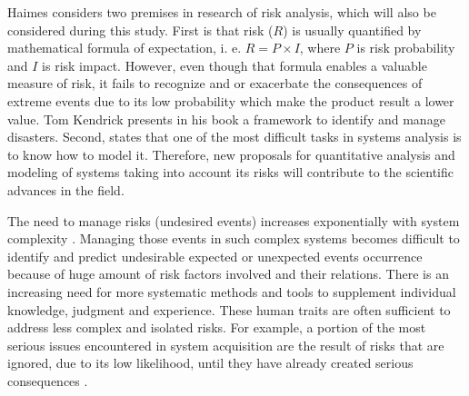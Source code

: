 Haimes \cite{Haimes2009} considers two premises in research of risk analysis, which will also be considered during this study. First is that risk ($R$) is usually quantified by mathematical formula of expectation, i. e. $R = P \times I$, where $P$ is risk probability and $I$ is risk impact. However, even though that formula enables a valuable measure of risk, it fails to recognize and or exacerbate the consequences of extreme events due to its low probability which make the product result a lower value. Tom Kendrick presents in his book \cite{KEND2003BOOK} a framework to identify and manage disasters. Second, states that one of the most difficult tasks in systems analysis is to know how to model it. Therefore, new proposals for quantitative analysis and modeling of systems taking into account its risks will contribute to the scientific advances in the field.

The need to manage risks (undesired events) increases exponentially with system complexity \cite{higuera1996software}. Managing those events in such complex systems becomes difficult to identify and predict undesirable expected or unexpected events occurrence because of huge amount of risk factors involved and their relations. There is an increasing need for more systematic methods and tools to supplement individual knowledge, judgment and experience. These human traits are often sufficient to address less complex and isolated risks. For example, a portion of the most serious issues encountered in system acquisition are the result of risks that are ignored, due to its low likelihood, until they have already created serious consequences \cite{higuera1996software}.

